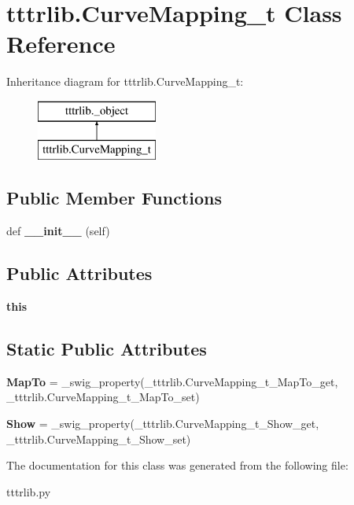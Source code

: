 \hypertarget{classtttrlib_1_1_curve_mapping__t}{}\section{tttrlib.\+Curve\+Mapping\+\_\+t Class Reference}
\label{classtttrlib_1_1_curve_mapping__t}
Inheritance diagram for tttrlib.\+Curve\+Mapping\+\_\+t\+:\begin{figure}[H]
\begin{center}
\leavevmode
\includegraphics[height=2.000000cm]{classtttrlib_1_1_curve_mapping__t}
\end{center}
\end{figure}
\subsection*{Public Member Functions}
\begin{DoxyCompactItemize}
\item 
\mbox{\label{classtttrlib_1_1_curve_mapping__t_a07ec0b238f5ab0192113be3bcb0bb51c}} 
def {\bfseries \+\_\+\+\_\+init\+\_\+\+\_\+} (self)
\end{DoxyCompactItemize}
\subsection*{Public Attributes}
\begin{DoxyCompactItemize}
\item 
\mbox{\label{classtttrlib_1_1_curve_mapping__t_affcdab2dbe7448350d6221f1a7b111b6}} 
{\bfseries this}
\end{DoxyCompactItemize}
\subsection*{Static Public Attributes}
\begin{DoxyCompactItemize}
\item 
\mbox{\label{classtttrlib_1_1_curve_mapping__t_a0b1a7615fd390255eea660eab3656b7e}} 
{\bfseries Map\+To} = \+\_\+swig\+\_\+property(\+\_\+tttrlib.\+Curve\+Mapping\+\_\+t\+\_\+\+Map\+To\+\_\+get, \+\_\+tttrlib.\+Curve\+Mapping\+\_\+t\+\_\+\+Map\+To\+\_\+set)
\item 
\mbox{\label{classtttrlib_1_1_curve_mapping__t_a067882b928d1eccb4fd174fdb54b5f44}} 
{\bfseries Show} = \+\_\+swig\+\_\+property(\+\_\+tttrlib.\+Curve\+Mapping\+\_\+t\+\_\+\+Show\+\_\+get, \+\_\+tttrlib.\+Curve\+Mapping\+\_\+t\+\_\+\+Show\+\_\+set)
\end{DoxyCompactItemize}


The documentation for this class was generated from the following file\+:\begin{DoxyCompactItemize}
\item 
tttrlib.\+py\end{DoxyCompactItemize}
